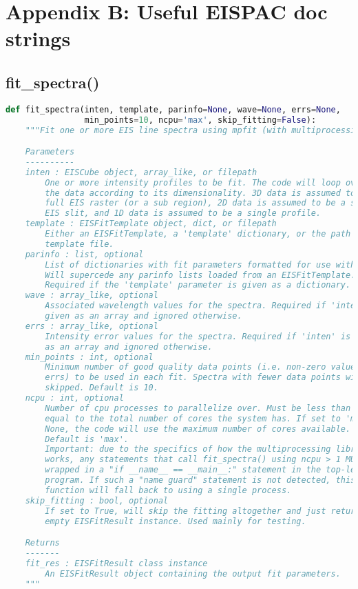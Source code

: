 
\chapter{Appendix B: Useful EISPAC doc strings}

\section{fit\_spectra()}
\label{sec:fitspec}

\begin{lstlisting}[language=Python]
def fit_spectra(inten, template, parinfo=None, wave=None, errs=None,
                min_points=10, ncpu='max', skip_fitting=False):
    """Fit one or more EIS line spectra using mpfit (with multiprocessing).

    Parameters
    ----------
    inten : EISCube object, array_like, or filepath
        One or more intensity profiles to be fit. The code will loop over 
        the data according to its dimensionality. 3D data is assumed to be a 
        full EIS raster (or a sub region), 2D data is assumed to be a single 
        EIS slit, and 1D data is assumed to be a single profile.
    template : EISFitTemplate object, dict, or filepath
        Either an EISFitTemplate, a 'template' dictionary, or the path to a
        template file.
    parinfo : list, optional
        List of dictionaries with fit parameters formatted for use with mpfit.
        Will supercede any parinfo lists loaded from an EISFitTemplate. 
        Required if the 'template' parameter is given as a dictionary.
    wave : array_like, optional
        Associated wavelength values for the spectra. Required if 'inten' is
        given as an array and ignored otherwise.
    errs : array_like, optional
        Intensity error values for the spectra. Required if 'inten' is given 
        as an array and ignored otherwise.
    min_points : int, optional
        Minimum number of good quality data points (i.e. non-zero values & 
        errs) to be used in each fit. Spectra with fewer data points will be 
        skipped. Default is 10.
    ncpu : int, optional
        Number of cpu processes to parallelize over. Must be less than or 
        equal to the total number of cores the system has. If set to 'max' or 
        None, the code will use the maximum number of cores available. 
        Default is 'max'.
        Important: due to the specifics of how the multiprocessing library 
        works, any statements that call fit_spectra() using ncpu > 1 MUST be 
        wrapped in a "if __name__ == __main__:" statement in the top-level 
        program. If such a "name guard" statement is not detected, this 
        function will fall back to using a single process.
    skip_fitting : bool, optional
        If set to True, will skip the fitting altogether and just return an 
        empty EISFitResult instance. Used mainly for testing.

    Returns
    -------
    fit_res : EISFitResult class instance
        An EISFitResult object containing the output fit parameters.
    """
\end{lstlisting}

